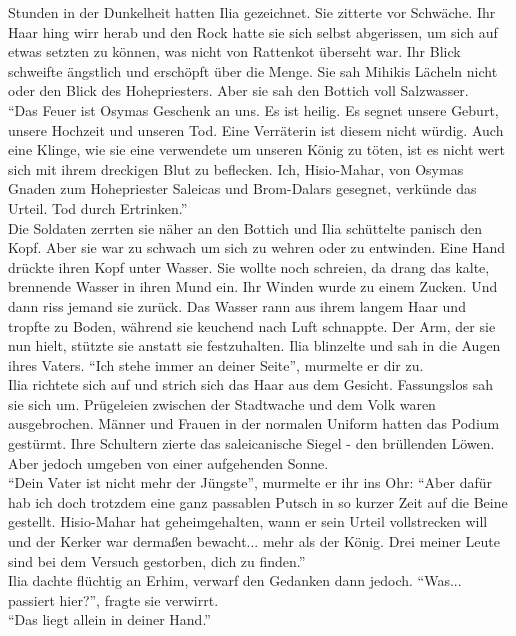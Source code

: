 Stunden in der Dunkelheit hatten Ilia gezeichnet. Sie zitterte vor Schwäche. Ihr Haar hing wirr 
herab und den Rock hatte sie sich selbst abgerissen, um sich auf etwas setzten zu können, was nicht 
von Rattenkot überseht war. Ihr Blick schweifte ängstlich und erschöpft über die Menge. Sie sah 
Mihikis Lächeln nicht oder den Blick des Hohepriesters. Aber sie sah den Bottich voll Salzwasser.\\
``Das Feuer ist Osymas Geschenk an uns. Es ist heilig. Es segnet unsere Geburt, unsere Hochzeit und 
unseren Tod. Eine Verräterin ist diesem nicht würdig. Auch eine Klinge, wie sie eine verwendete um 
unseren König zu töten, ist es nicht wert sich mit ihrem dreckigen Blut zu beflecken. Ich, 
Hisio-Mahar, von Osymas Gnaden zum Hohepriester Saleicas und Brom-Dalars gesegnet, verkünde das 
Urteil. Tod durch Ertrinken.''\\
Die Soldaten zerrten sie näher an den Bottich und Ilia schüttelte panisch den Kopf. Aber sie war zu 
schwach um sich zu wehren oder zu entwinden. Eine Hand drückte ihren Kopf unter Wasser. Sie wollte 
noch schreien, da drang das kalte, brennende Wasser in ihren Mund ein. Ihr Winden wurde zu 
einem Zucken. Und dann riss jemand sie zurück. Das Wasser rann aus ihrem langem Haar und tropfte zu 
Boden, während sie keuchend nach Luft schnappte. Der Arm, der sie nun hielt, stützte sie anstatt 
sie festzuhalten. Ilia blinzelte und sah in die Augen ihres Vaters. ``Ich stehe immer an deiner 
Seite'', murmelte er dir zu.\\
Ilia richtete sich auf und strich sich das Haar aus dem Gesicht. Fassungslos sah sie sich um. 
Prügeleien zwischen der Stadtwache und dem Volk waren ausgebrochen. Männer und Frauen in der 
normalen Uniform hatten das Podium gestürmt. Ihre Schultern zierte das saleicanische Siegel - den 
brüllenden Löwen. Aber jedoch umgeben von einer aufgehenden Sonne.\\
``Dein Vater ist nicht mehr der Jüngste'', murmelte er ihr ins Ohr: ``Aber dafür hab ich doch 
trotzdem eine ganz passablen Putsch in so kurzer Zeit auf die Beine gestellt. Hisio-Mahar hat 
geheimgehalten, wann er sein Urteil vollstrecken will und der Kerker war dermaßen bewacht... mehr 
als der König. Drei meiner Leute sind bei dem Versuch gestorben, dich zu finden.''\\
Ilia dachte flüchtig an Erhim, verwarf den Gedanken dann jedoch. ``Was... passiert hier?'', fragte 
sie verwirrt.\\
``Das liegt allein in deiner Hand.''\\
